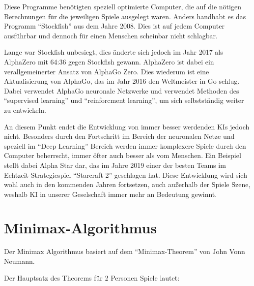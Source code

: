 
Diese Programme benötigten speziell optimierte Computer, die auf die nötigen Berechnungen für die jeweiligen Spiele ausgelegt waren. Anders handhabt es das Programm ``Stockfish'' aus dem Jahre 2008. Dies ist auf jedem Computer ausführbar und dennoch für einen Menschen scheinbar nicht schlagbar.

Lange war Stockfish unbesiegt, dies änderte sich jedoch im Jahr 2017 als AlphaZero mit 64:36 gegen Stockfish gewann. AlphaZero ist dabei ein verallgemeinerter Ansatz von AlphaGo Zero. Dies wiederum ist eine Aktualisierung von AlphaGo, das im Jahr 2016 den Weltmeister in Go schlug. Dabei verwendet AlphaGo neuronale Netzwerke und verwendet Methoden des ``supervised learning'' und ``reinforcment learning'', um sich selbstständig weiter zu entwickeln.


An diesem Punkt endet die Entwicklung von immer besser werdenden KIs jedoch nicht. Besonders durch den Fortschritt im Bereich der neuronalen Netze und speziell im ``Deep Learning'' Bereich werden immer komplexere Spiele durch den Computer beherrscht, immer öfter auch besser als vom Menschen. Ein Beispiel stellt dabei Alpha Star dar, das im Jahre 2019 einer der besten Teams im Echtzeit-Strategiespiel ``Starcraft 2'' geschlagen hat. Diese Entwicklung wird sich wohl auch in den kommenden Jahren fortsetzen, auch außerhalb der Spiele Szene, weshalb KI in unserer Geselschaft immer mehr an Bedeutung gewinnt.



\section{Minimax-Algorithmus}


Der Minimax Algorithmus basiert auf dem ``Minimax-Theorem''  von John Vonn Neumann.

Der Hauptsatz des Theorems für 2 Personen Spiele lautet:

